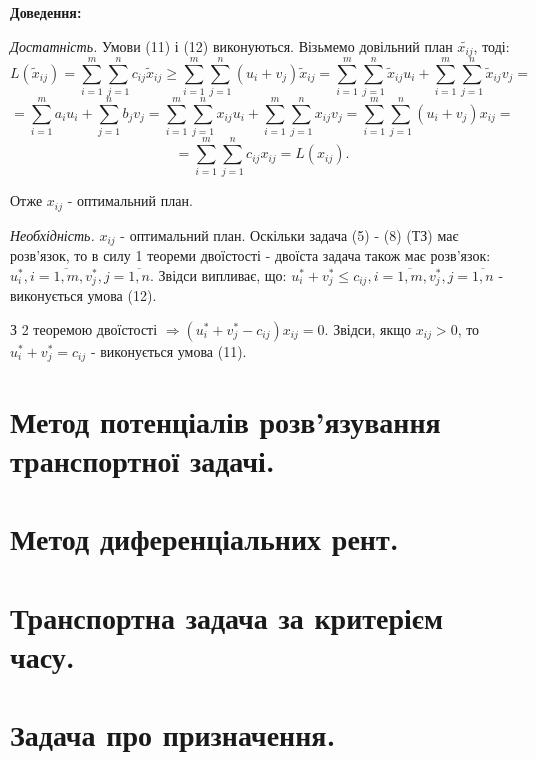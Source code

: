 \documentclass[12pt,a4paper]{article}
\begin{document}
{\bf Доведення:}

{\it Достатність.} Умови (11) і (12) виконуються. Візьмемо довільний план $\tilde{x_{ij}}$, тоді:\\
$$ L(\tilde{x}_{ij}) = \sum_{i=1}^m \sum_{j=1}^n c_{ij} \tilde{x}_{ij} \geq
 \sum_{i=1}^m \sum_{j=1}^n (u_i+v_j) \tilde{x}_{ij} = 
 \sum_{i=1}^m \sum_{j=1}^n \tilde{x}_{ij} u_i + \sum_{i=1}^m \sum_{j=1}^n  \tilde{x}_{ij} v_j = $$
$$ = \sum_{i=1}^m a_i u_i + \sum_{j=1}^n b_j v_j =
 \sum_{i=1}^m \sum_{j=1}^n x_{ij} u_i + \sum_{i=1}^m \sum_{j=1}^n  x_{ij} v_j =
 \sum_{i=1}^m \sum_{j=1}^n (u_i+v_j) x_{ij} = $$
$$ = \sum_{i=1}^m \sum_{j=1}^n c_{ij} x_{ij} = L(x_{ij}). $$

Отже $x_{ij}$ - оптимальний план.

{\it Необхідність.} $x_{ij}$ - оптимальний план. Оскільки задача (5) - (8) (ТЗ) має розв’язок, то в силу 1 теореми двоїстості - двоїста задача також має розв’язок: $u^*_i, i = \overline{1,m}, v^*_j, j= \overline{1,n}$. Звідси випливає, що: $u^*_i+v^*_j \leq c_{ij}, i = \overline{1,m}, v^*_j, j= \overline{1,n}$ - виконується умова (12).

З 2 теоремою двоїстості $\Rightarrow (u^*_i + v^*_j - c_{ij})x_{ij}=0$. Звідси, якщо $x_{ij}>0$, то $u^*_i + v^*_j = c_{ij}$ - виконується умова (11).

\clearpage

\section{Метод потенціалів розв'язування транспортної задачі.}

\clearpage

\section{Метод диференціальних рент.}

\clearpage

\section{Транспортна задача за критерієм часу.}

\clearpage

\section{Задача про призначення.}

\clearpage
\end{document}
